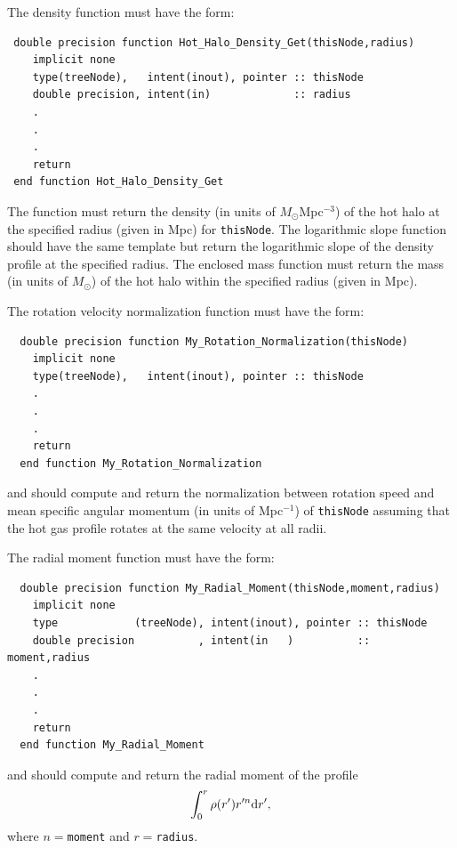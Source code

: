 The density function must have the form:
\begin{verbatim}
 double precision function Hot_Halo_Density_Get(thisNode,radius)
    implicit none
    type(treeNode),   intent(inout), pointer :: thisNode
    double precision, intent(in)             :: radius
    .
    .
    .
    return
 end function Hot_Halo_Density_Get
\end{verbatim}
The function must return the density (in units of $M_\odot$Mpc$^{-3}$) of the hot halo at the specified radius (given in Mpc) for {\tt thisNode}. The logarithmic slope function should have the same template but return the logarithmic slope of the density profile at the specified radius. The enclosed mass function must return the mass (in units of $M_\odot$) of the hot halo within the specified radius (given in Mpc).

The rotation velocity normalization function must have the form:
\begin{verbatim}
  double precision function My_Rotation_Normalization(thisNode)
    implicit none
    type(treeNode),   intent(inout), pointer :: thisNode
    .
    .
    .
    return
  end function My_Rotation_Normalization
\end{verbatim}
and should compute and return the normalization between rotation speed and mean specific angular momentum (in units of Mpc$^{-1}$) of {\tt thisNode} assuming that the hot gas profile rotates at the same velocity at all radii.

The radial moment function must have the form:
\begin{verbatim}
  double precision function My_Radial_Moment(thisNode,moment,radius)
    implicit none
    type            (treeNode), intent(inout), pointer :: thisNode
    double precision          , intent(in   )          :: moment,radius
    .
    .
    .
    return
  end function My_Radial_Moment
\end{verbatim}
and should compute and return the radial moment of the profile
\begin{equation}
\int_0^r \rho(r^\prime) r^{\prime n} {\rm d}r^\prime,
\end{equation}
where $n=${\tt moment} and $r=${\tt radius}.

